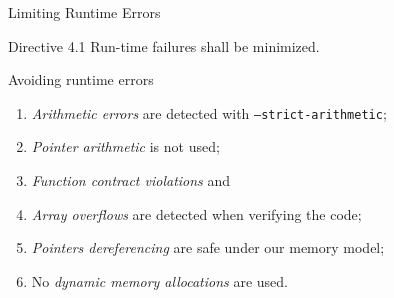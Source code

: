 \documentclass[xcolor={usenames,dvipsnames}]{beamer}
\newcommand{\Inline}[1]{\texttt{#1}}
\begin{document}
\begin{frame}{Limiting Runtime Errors}

  \begin{exampleblock}{Directive 4.1}
    Run-time failures shall be minimized.
  \end{exampleblock}


  \pause

  \begin{block}{Avoiding runtime errors}
    \begin{enumerate}
      \item \emph{Arithmetic errors} are detected with {\footnotesize\Inline{--strict-arithmetic}};
      \item \emph{Pointer arithmetic} is not used;
      \item \emph{Function contract violations} and
      \item \emph{Array overflows} are detected when verifying the code;
      \item \emph{Pointers dereferencing} are safe under our memory model;
      \item No \emph{dynamic memory allocations} are used.
    \end{enumerate}
  \end{block}

\end{frame}
\end{document}
